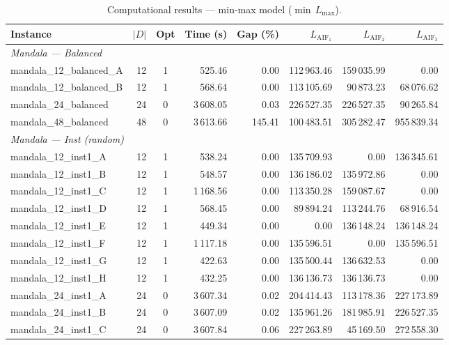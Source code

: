 \documentclass{article}
\begin{document}
\begin{table}[h!]
\centering
\scriptsize
\caption{Computational results --- min-max model ($\min\, L_{\max}$).}
\label{tab:results_max}
\begin{tabular}{@{}l r c r r r r r@{}}
\toprule
\textbf{Instance} & $|D|$ & \textbf{Opt} & \textbf{Time (s)} & \textbf{Gap (\%)} & $L_{\text{AIF}_1}$ & $L_{\text{AIF}_2}$ & $L_{\text{AIF}_3}$ \\
\midrule
\multicolumn{8}{l}{\textit{Mandala --- Balanced}} \\
\midrule
mandala\_12\_balanced\_A & 12 & 1 & 525.46 & 0.00 & 112\,963.46 & 159\,035.99 & 0.00 \\
mandala\_12\_balanced\_B & 12 & 1 & 568.64 & 0.00 & 113\,105.69 & 90\,873.23 & 68\,076.62 \\
mandala\_24\_balanced    & 24 & 0 & 3\,608.05 & 0.03 & 226\,527.35 & 226\,527.35 & 90\,265.84 \\
mandala\_48\_balanced    & 48 & 0 & 3\,613.66 & 145.41 & 100\,483.51 & 305\,282.47 & 955\,839.34 \\
\midrule
\multicolumn{8}{l}{\textit{Mandala --- Inst (random)}} \\
\midrule
mandala\_12\_inst1\_A & 12 & 1 & 538.24 & 0.00 & 135\,709.93 & 0.00 & 136\,345.61 \\
mandala\_12\_inst1\_B & 12 & 1 & 548.57 & 0.00 & 136\,186.02 & 135\,972.86 & 0.00 \\
mandala\_12\_inst1\_C & 12 & 1 & 1\,168.56 & 0.00 & 113\,350.28 & 159\,087.67 & 0.00 \\
mandala\_12\_inst1\_D & 12 & 1 & 568.45 & 0.00 & 89\,894.24 & 113\,244.76 & 68\,916.54 \\
mandala\_12\_inst1\_E & 12 & 1 & 449.34 & 0.00 & 0.00 & 136\,148.24 & 136\,148.24 \\
mandala\_12\_inst1\_F & 12 & 1 & 1\,117.18 & 0.00 & 135\,596.51 & 0.00 & 135\,596.51 \\
mandala\_12\_inst1\_G & 12 & 1 & 422.63 & 0.00 & 135\,500.44 & 136\,632.53 & 0.00 \\
mandala\_12\_inst1\_H & 12 & 1 & 432.25 & 0.00 & 136\,136.73 & 136\,136.73 & 0.00 \\
mandala\_24\_inst1\_A & 24 & 0 & 3\,607.34 & 0.02 & 204\,414.43 & 113\,178.36 & 227\,173.89 \\
mandala\_24\_inst1\_B & 24 & 0 & 3\,607.09 & 0.02 & 135\,961.26 & 181\,985.91 & 226\,527.35 \\
mandala\_24\_inst1\_C & 24 & 0 & 3\,607.84 & 0.06 & 227\,263.89 & 45\,169.50 & 272\,558.30 \\

\end{tabular}
\end{table}
\end{document}
